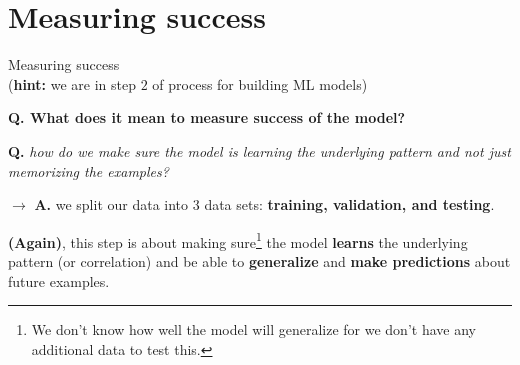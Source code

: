 \section{Measuring success}
\begin{transitionframe}
  \begin{center}
    \Huge Measuring success\\
    (\textbf{hint:} we are in step $2$ of process for building ML models)
  \end{center}
\end{transitionframe}

\begin{frame}[fragile, label={distance}]{\textbf{Q. What does it mean to measure success of the model?}}
  \begin{wideitemize}
    \item \textbf{Q.} \textit{how do we make sure the model is learning the underlying
      pattern and not just memorizing the examples?}
    \item $\rightarrow$ \textbf{A.} we split our data into $3$ data sets:
      \textbf{training, validation, and testing}.
    \item \textbf{(Again)}, this step is about making sure\footnote{We
        don't know how well the model will generalize for we don't have any
        additional data to test this.} the model \textbf{learns} the underlying pattern
      (or correlation) and be able to \textbf{generalize} and \textbf{make
        predictions} about future examples.
  \end{wideitemize}
\end{frame}

